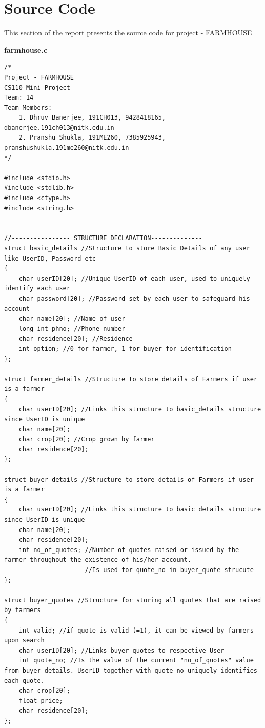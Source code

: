 \documentclass[12pt]{article}
\begin{document}


\newpage                            %
\section{Source Code}               %


This section of the report presents the source code for project - FARMHOUSE

\noindent \textbf{farmhouse.c}


\begin{lstlisting}
/*
Project - FARMHOUSE
CS110 Mini Project
Team: 14
Team Members:
    1. Dhruv Banerjee, 191CH013, 9428418165, dbanerjee.191ch013@nitk.edu.in
    2. Pranshu Shukla, 191ME260, 7385925943, pranshushukla.191me260@nitk.edu.in
*/

#include <stdio.h>
#include <stdlib.h>
#include <ctype.h>
#include <string.h>


//---------------- STRUCTURE DECLARATION--------------
struct basic_details //Structure to store Basic Details of any user like UserID, Password etc
{
    char userID[20]; //Unique UserID of each user, used to uniquely identify each user
    char password[20]; //Password set by each user to safeguard his account
    char name[20]; //Name of user
    long int phno; //Phone number
    char residence[20]; //Residence
    int option; //0 for farmer, 1 for buyer for identification
};

struct farmer_details //Structure to store details of Farmers if user is a farmer
{
    char userID[20]; //Links this structure to basic_details structure since UserID is unique
    char name[20];
    char crop[20]; //Crop grown by farmer
    char residence[20];
};

struct buyer_details //Structure to store details of Farmers if user is a farmer
{
    char userID[20]; //Links this structure to basic_details structure since UserID is unique
    char name[20];
    char residence[20];
    int no_of_quotes; //Number of quotes raised or issued by the farmer throughout the existence of his/her account.
                      //Is used for quote_no in buyer_quote strucute
};

struct buyer_quotes //Structure for storing all quotes that are raised by farmers
{
    int valid; //if quote is valid (=1), it can be viewed by farmers upon search
    char userID[20]; //Links buyer_quotes to respective User
    int quote_no; //Is the value of the current "no_of_quotes" value from buyer_details. UserID together with quote_no uniquely identifies each quote.
    char crop[20];
    float price;
    char residence[20];
};


\end{lstlisting}
\end{document}
